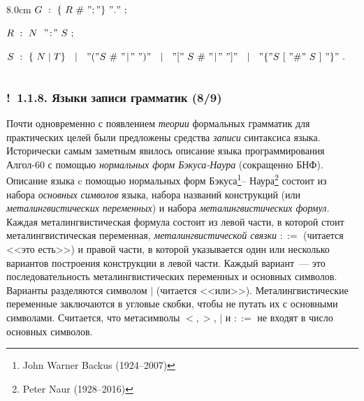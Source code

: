 \documentclass[mathserif,12pt,aspectratio=169]{beamer}
\def\emразделенной{\em разделенной}
\renewcommand{\index}[1]{}
\def\em#1{\it\color{blue}#1}
\def\odmkey#1#2{{\it\color{red} #1}\index{#2}}
\def\Ok{{\color{green}\textbf{!}\ }}
\begin{document}
\begin{frame}
\begin{columns}[t]
\begin{column}{8.0cm}
$G\ :\ \{\ R\ \#\ ";" \}\ "."\ ; $

$R\ :\ N\ \ "\!:\!"\ S\ ;$

$S\ :\ \{\ N \mid T \}\ \ \mid \ \ 
"(" S\ \#\ "\!\mid\!"\ ")" \ \ \mid \ \ \hfill\linebreak 
"["\ S\ \#\ "\!\mid\!"\ "]" \ \ \mid \ \ 
"\{" S \ [\ "\#"\ S\ ]\ "\}" \ 
. $
\end{column} 
\end{columns}
\end{frame}


\begin{frame}
\frametitle{\Ok 1.1.8. Языки записи грамматик (8/9)}
Почти одновременно с появлением {\em теории} формальных
грамматик для
практических целей были предложены средства {\em записи}
синтаксиса языка.
Исторически самым заметным явилось описание языка программирования
Алгол-60 с помощью \odmkey{нормальных форм
Бэкуса-Наура}{Нормальная форма!Бэкуса-Наура}
 (сокращенно БНФ).
Описание языка c помощью нормальных форм 
Бэкуса\footnote{John Warner Backus (1924--2007)}--
Наура\footnote{Peter Naur (1928--2016)} 
состоит из набора 
\odmkey{основных символов}{Символ!основной} языка, 
набора названий конструкций (или
\odmkey{металингвистических
переменных}{Переменная!металингвистическая}) и набора
\odmkey{металингвистических формул}{Формула!металингвистическая}.
Каждая металингвистическая формула состоит
из левой части, в которой
стоит металингвистическая переменная, \odmkey{металингвистической
связки}{Связка!металингвистическая} $::=$ (читается <<это есть>>)
и правой части, в которой указывается один или несколько вариантов
построения конструкции в левой части. Каждый вариант~--- это
последовательность металингвистических переменных и основных
символов. Варианты разделяются символом $|$ (читается <<или>>).
Металингвистические переменные заключаются в угловые скобки, чтобы
не путать их с основными символами. Считается, что метасимволы $<,
>$, $|$ и $::=$ не входят в число основных символов.

\end{frame}
\end{document}
